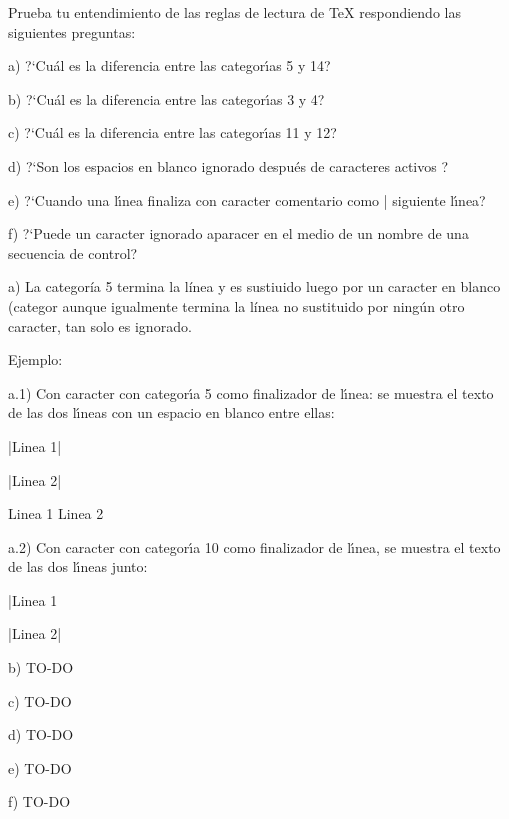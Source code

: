 

\bigskip

\enunciadoS Prueba tu entendimiento de las reglas de lectura de {\TeX} respondiendo las siguientes preguntas:

\noindent a) ?`Cu\'al es la diferencia entre las categor\'{\i}as 5 y
14?

\noindent b) ?`Cu\'al es la diferencia entre las categor\'{\i}as 3 y
4?

\noindent c) ?`Cu\'al es la diferencia entre las categor\'{\i}as 11 y
12?

\noindent d) ?`Son los espacios en blanco ignorado despu\'es de
caracteres activos ?

\noindent e) ?`Cuando una l\'{\i}nea finaliza con caracter comentario
como |%
siguiente l\'{\i}nea?

\noindent f) ?`Puede un caracter ignorado aparacer en el medio de un
nombre de una secuencia de control?

\bigskip

\respuestaS
\noindent a) La categoría 5 termina la línea y es sustiuido luego por
un caracter en blanco (categor%
aunque igualmente termina la línea no sustituido por ningún otro
caracter, tan solo es ignorado.

\noindent Ejemplo:

\noindent a.1) Con caracter con categor\'{\i}a 5 como finalizador de l\'{\i}nea: se muestra el texto de las dos l\'{\i}neas con un espacio en blanco entre ellas:

\noindent |Linea 1|

\noindent |Linea 2|

Linea 1
Linea 2

\medskip

\noindent a.2) Con caracter con categor\'{\i}a 10 como finalizador de l\'{\i}nea, se muestra el texto de las dos l\'{\i}neas junto:

\noindent |Linea 1%

\noindent |Linea 2|

\medskip

\noindent b) TO-DO

\medskip

\noindent c) TO-DO

\medskip

\noindent d) TO-DO

\medskip

\noindent e) TO-DO

\medskip

\noindent f) TO-DO

\bye

